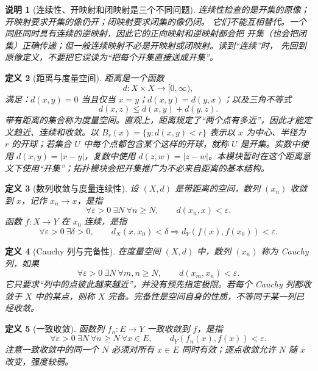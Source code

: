 \documentclass[UTF8,fontset=none,a4paper,11pt]{ctexart}
\theoremstyle{foundation-definition}
\newtheorem{definition}{定义}[section]
\theoremstyle{foundation-theorem}
\theoremstyle{foundation-proposition}
\theoremstyle{foundation-example}
\theoremstyle{foundation-remark}
\newtheorem{remark}[definition]{说明}
\theoremstyle{foundation-theorem}
\begin{document}
\begin{remark}[连续性、开映射和闭映射是三个不同问题]
连续性检查的是开集的原像；开映射要求开集的像仍开；闭映射要求闭集的像仍闭。
它们不能互相替代。一个同胚同时具有连续的逆映射，因此它的正向映射和逆映射都会把
开集（也会把闭集）正确传递；但一般连续映射不必是开映射或闭映射。读到“连续”时，
先回到原像定义，不要把它误读为“把每个开集直接送成开集”。
\end{remark}

\begin{definition}[距离与度量空间]\label{def:metric-space}
距离是一个函数
\[
d:X\times X\longrightarrow[0,\infty),
\]
满足：\(d(x,y)=0\) 当且仅当 \(x=y\)；\(d(x,y)=d(y,x)\)；以及三角不等式
\[
d(x,z)\leq d(x,y)+d(y,z).
\]
带有距离的集合称为度量空间。直观上，距离规定了“两个点有多近”，因此才能定义趋近、连续和收敛。以 \(B_r(x)=\{y:d(x,y)<r\}\) 表示以 \(x\) 为中心、半径为 \(r\) 的开球；若集合 \(U\) 中每个点都包含某个这样的开球，就称 \(U\) 是开集。实数中使用 \(d(x,y)=|x-y|\)，复数中使用 \(d(z,w)=|z-w|\)。本模块暂时在这个距离意义下使用“开集”；拓扑模块会把开集推广为不必来自距离的基本结构。
\end{definition}

\begin{definition}[数列收敛与度量连续性]\label{def:analysis-foundations}
设 \((X,d)\) 是带距离的空间，数列 \((x_n)\) 收敛到 \(x\)，记作 \(x_n\to x\)，是指
\[
\forall\varepsilon>0\ \exists N\ \forall n\geq N,
\qquad d(x_n,x)<\varepsilon.
\]
函数 \(f:X\to Y\) 在 \(x_0\) 连续，是指
\[
\forall\varepsilon>0\ \exists\delta>0,\qquad
d_X(x,x_0)<\delta\Longrightarrow d_Y(f(x),f(x_0))<\varepsilon.
\]
\end{definition}

\begin{definition}[Cauchy 列与完备性]\label{def:cauchy-complete}
在度量空间 \((X,d)\) 中，数列 \((x_n)\) 称为 Cauchy 列，如果
\[
\forall\varepsilon>0\ \exists N\ \forall m,n\geq N,\qquad
d(x_m,x_n)<\varepsilon.
\]
它只要求“列中的点彼此越来越近”，并没有预先指定极限。若每个 Cauchy 列都收敛于 \(X\)
中的某点，则称 \(X\) 完备。完备性是空间自身的性质，不等同于某一列已经收敛。
\end{definition}

\begin{definition}[一致收敛]\label{def:uniform-convergence}
函数列 \(f_n:E\to Y\) 一致收敛到 \(f\)，是指
\[
\forall\varepsilon>0\ \exists N\ \forall n\geq N\ \forall x\in E,
\qquad d_Y(f_n(x),f(x))<\varepsilon.
\]
注意一致收敛中的同一个 \(N\) 必须对所有 \(x\in E\) 同时有效；逐点收敛允许 \(N\) 随 \(x\) 改变，强度较弱。
\end{definition}
\end{document}

